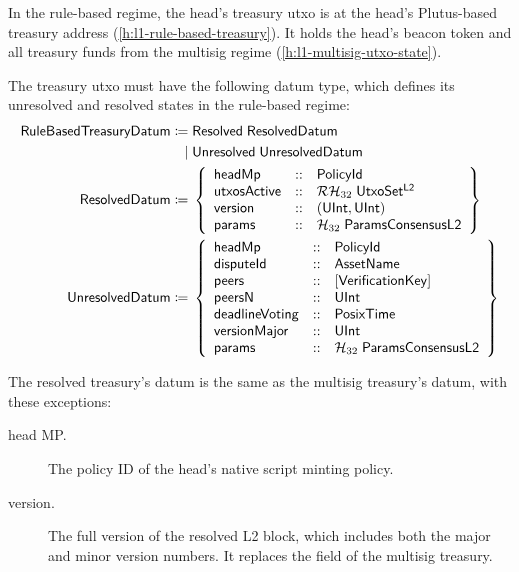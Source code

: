 \documentclass[../hydrozoa.tex]{subfiles}
\begin{document}
In the rule-based regime, the head's treasury utxo is at the head's Plutus-based treasury address (\cref{h:l1-rule-based-treasury}).
It holds the head's beacon token and all treasury funds from the multisig regime (\cref{h:l1-multisig-utxo-state}).

The treasury utxo must have the following datum type, which defines its unresolved and resolved states in the rule-based regime:
\begin{equation*}
\begin{split}
  \mathsf{RuleBasedTreasuryDatum} \coloneq&\;
    \mathsf{Resolved} \; \mathsf{ResolvedDatum} \\\mid&\;
    \mathsf{Unresolved} \; \mathsf{UnresolvedDatum} \\
  \mathsf{ResolvedDatum} \coloneq&\;\left\{
    \begin{array}{lll}
      \mathsf{headMp} &::& \mathsf{PolicyId} \\
      \mathsf{utxosActive}  &::& \mathcal{RH}_{32} \; \mathsf{UtxoSet^{L2}} \\
      \mathsf{version} &::& (\mathsf{UInt}, \mathsf{UInt}) \\
      \mathsf{params} &::& \mathcal{H}_{32} \; \mathsf{ParamsConsensusL2}
    \end{array}\right\} \\
  \mathsf{UnresolvedDatum} \coloneq&\;\left\{
    \begin{array}{lll}
      \mathsf{headMp} &::& \mathsf{PolicyId} \\
      \mathsf{disputeId} &::& \mathsf{AssetName} \\
      \mathsf{peers} &::& \mathsf{[VerificationKey]} \\
      \mathsf{peersN} &::& \mathsf{UInt} \\
      \mathsf{deadlineVoting} &::& \mathsf{PosixTime} \\
      \mathsf{versionMajor} &::& \mathsf{UInt} \\
      \mathsf{params} &::& \mathcal{H}_{32} \; \mathsf{ParamsConsensusL2}
    \end{array}\right\}
\end{split}
\end{equation*}

The resolved treasury's datum is the same as the multisig treasury's datum, with these exceptions:
\begin{description}
  \item[head MP.] The policy ID of the head's native script minting policy.
  \item[version.] The full version of the resolved L2 block, which includes both the major and minor version numbers.
  It replaces the  field of the multisig treasury.
\end{description}
\end{document}

